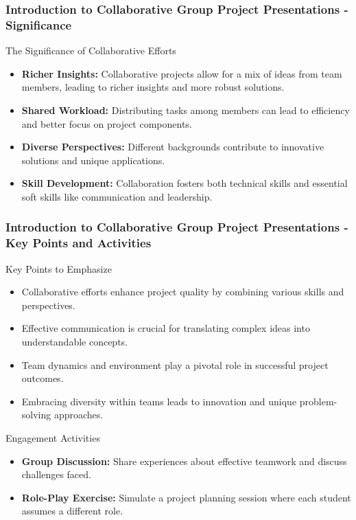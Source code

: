 \documentclass[aspectratio=169]{beamer}
\begin{document}
\begin{frame}[fragile]
    \frametitle{Introduction to Collaborative Group Project Presentations - Significance}
    
    \begin{block}{The Significance of Collaborative Efforts}
        \begin{itemize}
            \item \textbf{Richer Insights:} Collaborative projects allow for a mix of ideas from team members, leading to richer insights and more robust solutions.
            \item \textbf{Shared Workload:} Distributing tasks among members can lead to efficiency and better focus on project components.
            \item \textbf{Diverse Perspectives:} Different backgrounds contribute to innovative solutions and unique applications.
            \item \textbf{Skill Development:} Collaboration fosters both technical skills and essential soft skills like communication and leadership.
        \end{itemize}
    \end{block}
\end{frame}

\begin{frame}[fragile]
    \frametitle{Introduction to Collaborative Group Project Presentations - Key Points and Activities}
    
    \begin{block}{Key Points to Emphasize}
        \begin{itemize}
            \item Collaborative efforts enhance project quality by combining various skills and perspectives.
            \item Effective communication is crucial for translating complex ideas into understandable concepts.
            \item Team dynamics and environment play a pivotal role in successful project outcomes.
            \item Embracing diversity within teams leads to innovation and unique problem-solving approaches.
        \end{itemize}
    \end{block}
    
    \begin{block}{Engagement Activities}
        \begin{itemize}
            \item \textbf{Group Discussion:} Share experiences about effective teamwork and discuss challenges faced.
            \item \textbf{Role-Play Exercise:} Simulate a project planning session where each student assumes a different role.
        \end{itemize}
    \end{block}
\end{frame}
\end{document}
